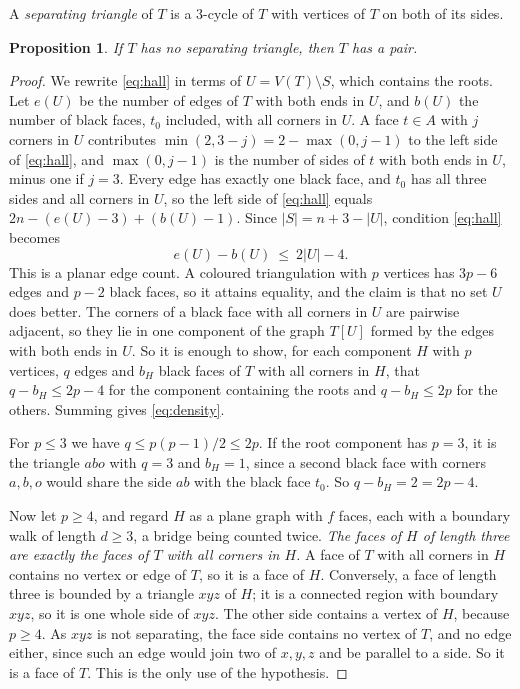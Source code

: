 \documentclass[10pt]{amsart}
\numberwithin{equation}{section}
\newtheorem{proposition}[equation]{Proposition}
\theoremstyle{definition}
\theoremstyle{remark}
\newcommand{\T}{T}
\begin{document}
A \emph{separating triangle} of $\T$ is a $3$-cycle of $\T$ with vertices of $\T$ on both of its sides.

\begin{proposition}\label{prop:pair}
If $\T$ has no separating triangle, then $\T$ has a pair.
\end{proposition}

\begin{proof}
We rewrite \eqref{eq:hall} in terms of $U=V(\T)\setminus S$, which contains the roots.
Let $e(U)$ be the number of edges of $\T$ with both ends in $U$, and $b(U)$ the number of black faces, $t_0$ included, with all corners in $U$.
A face $t\in A$ with $j$ corners in $U$ contributes $\min(2,3-j)=2-\max(0,j-1)$ to the left side of \eqref{eq:hall}, and $\max(0,j-1)$ is the number of sides of $t$ with both ends in $U$, minus one if $j=3$.
Every edge has exactly one black face, and $t_0$ has all three sides and all corners in $U$, so the left side of \eqref{eq:hall} equals $2n-(e(U)-3)+(b(U)-1)$.
Since $|S|=n+3-|U|$, condition \eqref{eq:hall} becomes
\begin{equation}\label{eq:density}
e(U)-b(U)\ \le\ 2|U|-4 .
\end{equation}
This is a planar edge count.
A coloured triangulation with $p$ vertices has $3p-6$ edges and $p-2$ black faces, so it attains equality, and the claim is that no set $U$ does better.
The corners of a black face with all corners in $U$ are pairwise adjacent, so they lie in one component of the graph $\T[U]$ formed by the edges with both ends in $U$.
So it is enough to show, for each component $H$ with $p$ vertices, $q$ edges and $b_H$ black faces of $\T$ with all corners in $H$, that $q-b_H\le 2p-4$ for the component containing the roots and $q-b_H\le 2p$ for the others. Summing gives \eqref{eq:density}.

For $p\le3$ we have $q\le p(p-1)/2\le 2p$.
If the root component has $p=3$, it is the triangle $abo$ with $q=3$ and $b_H=1$, since a second black face with corners $a,b,o$ would share the side $ab$ with the black face $t_0$. So $q-b_H=2=2p-4$.

Now let $p\ge4$, and regard $H$ as a plane graph with $f$ faces, each with a boundary walk of length $d\ge3$, a bridge being counted twice.
\emph{The faces of $H$ of length three are exactly the faces of $\T$ with all corners in $H$.}
A face of $\T$ with all corners in $H$ contains no vertex or edge of $\T$, so it is a face of $H$.
Conversely, a face of length three is bounded by a triangle $xyz$ of $H$; it is a connected region with boundary $xyz$, so it is one whole side of $xyz$.
The other side contains a vertex of $H$, because $p\ge4$.
As $xyz$ is not separating, the face side contains no vertex of $\T$, and no edge either, since such an edge would join two of $x,y,z$ and be parallel to a side. So it is a face of $\T$.
This is the only use of the hypothesis.


\end{proof}
\end{document}
